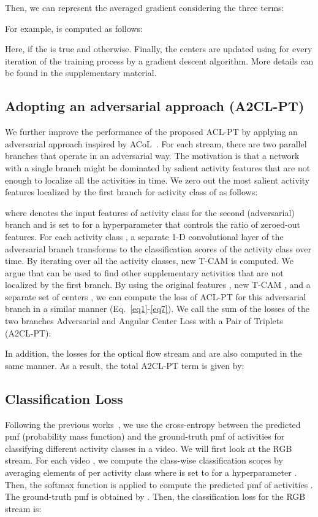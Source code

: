 \documentclass[runningheads]{llncs}
\newcommand{\tcam}{\mbox{T-CAM}}
\newcommand{\ourlossnamelong}{Adversarial and Angular Center Loss with a Pair of Triplets}
\newcommand{\ourlossname}{\mbox{A2CL-PT}}
\newcommand{\intlossname}{\mbox{ACL-PT}}
\begin{document}
Then, we can represent the averaged gradient considering the three terms:

For example,  is computed as follows:

Here,  if the  is true and  otherwise. Finally, the centers are updated using  for every iteration of the training process by a gradient descent algorithm. More details can be found in the supplementary material.

\subsection{Adopting an adversarial approach (\ourlossname{})}
We further improve the performance of the proposed \intlossname{} by applying an adversarial approach inspired by ACoL~\cite{zhang2018adversarial}. For each stream, there are two parallel branches that operate in an adversarial way. The motivation is that a network with a single branch might be dominated by salient activity features that are not enough to localize all the activities in time. We zero out the most salient activity features localized by the first branch for activity class  of  as follows:

where  denotes the input features of activity class  for the second (adversarial) branch and  is set to  for a hyperparameter  that controls the ratio of zeroed-out features. For each activity class , a separate 1-D convolutional layer of the adversarial branch transforms  to the classification scores of the activity class  over time. By iterating over all the activity classes, new \tcam{}  is computed. We argue that  can be used to find other supplementary activities that are not localized by the first branch. By using the original features , new \tcam{} , and a separate set of centers , we can compute the loss of \intlossname{} for this adversarial branch  in a similar manner (Eq.~\ref{eq1}-\ref{eq7}). We call the sum of the losses of the two branches \ourlossnamelong{} (\ourlossname{}):

In addition, the losses for the optical flow stream  and  are also computed in the same manner. As a result, the total \ourlossname{} term is given by:



\subsection{Classification Loss} \label{subsec:clsloss}
Following the previous works~\cite{paul2018w,liu2019completeness,narayan20193c}, we use the cross-entropy between the predicted pmf (probability mass function) and the ground-truth pmf of activities for classifying different activity classes in a video. We will first look at the RGB stream. For each video , we compute the class-wise classification scores  by averaging  elements of  per activity class where  is set to  for a hyperparameter . Then, the softmax function is applied to compute the predicted pmf of activities . The ground-truth pmf  is obtained by  . Then, the classification loss for the RGB stream is:
\end{document}
